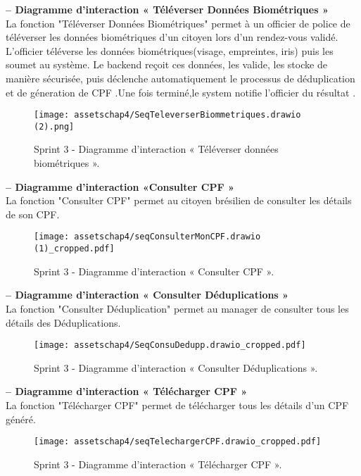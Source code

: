 \textbf{– Diagramme d'interaction « Téléverser Données Biométriques »}\\
La fonction "Téléverser Données Biométriques" permet à un officier de police de téléverser les données biométriques d'un citoyen lors d'un rendez-vous validé. L'officier téléverse les données biométriques(visage, empreintes, iris) puis les soumet au système. Le backend reçoit ces données, les valide, les stocke de manière sécurisée, puis déclenche automatiquement le processus de déduplication et de géneration de CPF .Une fois terminé,le system notifie l'officier du résultat .
\begin{figure}[H]
\centering
\texttt{[image: assetschap4/SeqTeleverserBiommetriques.drawio (2).png]}
\caption{ Sprint 3 - Diagramme d'interaction « Téléverser données biométriques ». }
\end{figure}




\textbf{– Diagramme d'interaction «Consulter CPF »}\\
La fonction "Consulter CPF" permet au citoyen brésilien de consulter les détails de son CPF.
\begin{figure}[H]
\centering
\texttt{[image: assetschap4/seqConsulterMonCPF.drawio (1)\_cropped.pdf]}
\caption{ Sprint 3 - Diagramme d'interaction « Consulter CPF ». }
\end{figure}





\textbf{– Diagramme d'interaction « Consulter Déduplications »}\\
La fonction "Consulter Déduplication" permet au manager de consulter tous les détails des Déduplications.
\begin{figure}[H]
\centering
\texttt{[image: assetschap4/SeqConsuDedupp.drawio\_cropped.pdf]}
\caption{ Sprint 3 - Diagramme d'interaction « Consulter Déduplications ». }
\end{figure}




\textbf{– Diagramme d'interaction « Télécharger CPF »}\\
La fonction "Télécharger CPF" permet de télécharger tous les détails d'un CPF généré.
\begin{figure}[H]
\centering
\texttt{[image: assetschap4/seqTelechargerCPF.drawio\_cropped.pdf]}
\caption{ Sprint 3 - Diagramme d'interaction « Télécharger CPF ». }
\end{figure}







